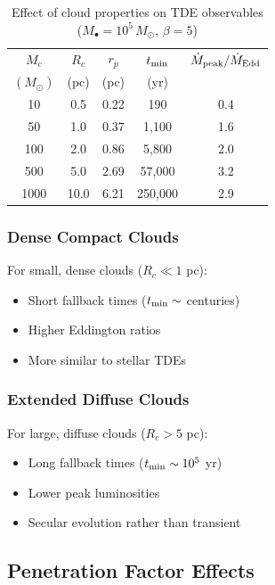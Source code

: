 \documentclass[twocolumn,amsmath,amssymb,prd,superscriptaddress,nofootinbib]{revtex4-2}
\begin{document}
\begin{table}[h]
\centering
\caption{Effect of cloud properties on TDE observables ($M_\bullet = 10^5\,M_\odot$, $\beta = 5$)}
\label{tab:cloud_survey}
\begin{tabular}{ccccc}
\toprule
$M_c$ & $R_c$ & $r_p$ & $t_{\rm min}$ & $\dot{M}_{\rm peak}/\dot{M}_{\rm Edd}$ \\
$(M_\odot)$ & (pc) & (pc) & (yr) & \\
\midrule
10 & 0.5 & 0.22 & 190 & 0.4 \\
50 & 1.0 & 0.37 & 1,100 & 1.6 \\
100 & 2.0 & 0.86 & 5,800 & 2.0 \\
500 & 5.0 & 2.69 & 57,000 & 3.2 \\
1000 & 10.0 & 6.21 & 250,000 & 2.9 \\
\bottomrule
\end{tabular}
\end{table}

\subsubsection{Dense Compact Clouds}

For small, dense clouds ($R_c \ll 1$ pc):
\begin{itemize}
    \item Short fallback times ($t_{\rm min} \sim$ centuries)
    \item Higher Eddington ratios
    \item More similar to stellar TDEs
\end{itemize}

\subsubsection{Extended Diffuse Clouds}

For large, diffuse clouds ($R_c > 5$ pc):
\begin{itemize}
    \item Long fallback times ($t_{\rm min} \sim 10^5$ yr)
    \item Lower peak luminosities
    \item Secular evolution rather than transient
\end{itemize}

\subsection{Penetration Factor Effects}
\label{sec:beta_effects}
\end{document}
